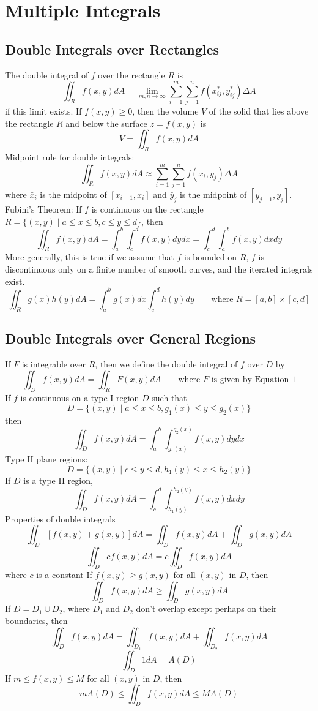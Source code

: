 \documentclass{article}
\title{} %
\author{John Yang}
\begin{document}
    \maketitle
    \tableofcontents
    \section{Multiple Integrals} %
    \subsection{Double Integrals over Rectangles} %
    \begin{outline}
        \1 The double integral of $f$ over the rectangle $R$ is \[\iint_Rf(x,y)dA=\lim_{m,n\to\infty}\sum^m_{i=1}\sum^n_{j=1}f(x_{ij}^*,y_{ij}^*)\Delta A\] if this limit exists. 
        \1 If \(f(x,y)\geq 0\), then the volume $V$ of the solid that lies above the rectangle $R$ and below the surface \(z=f(x,y)\) is \[V=\iint_Rf(x,y)dA\]
        \1 Midpoint rule for double integrals: \[\iint_Rf(x,y)dA\approx\sum^m_{i=1}\sum^n_{j=1}f(\bar x_i,\bar y_j)\Delta A\] where \(\bar x_i\) is the midpoint of \([x_{i-1},x_i]\) and \(\bar y_j\) is the midpoint of \([y_{j-1},y_j]\). 
        \1 Fubini's Theorem: If $f$ is continuous on the rectangle \(R=\{(x,y)\;|\;a\leq x\leq b,c\leq y\leq d\}\), then \[\iint_Rf(x,y)dA=\int^b_a\int^d_cf(x,y)dydx=\int^d_c\int^b_af(x,y)dxdy\] More generally, this is true if we assume that $f$ is bounded on $R$, $f$ is discontinuous only on a finite number of smooth curves, and the iterated integrals exist. 
        \1 \[\iint_Rg(x)h(y)dA=\int^b_ag(x)dx\int^d_ch(y)dy\qquad\text{where }R=[a,b]\times[c,d]\]

    \end{outline}
    \subsection{Double Integrals over General Regions}
    \begin{outline}
        \1 If $F$ is integrable over $R$, then we define the double integral of $f$ over $D$ by \[\iint_Df(x,y)dA=\iint_RF(x,y)dA\qquad\text{where }F\text{ is given by Equation 1}\]
        \1 If $f$ is continuous on a type I region $D$ such that \[D=\{(x,y)\;|\;a\leq x\leq b, g_1(x)\leq y\leq g_2(x)\}\] then \[\iint_Df(x,y)dA=\int^b_a\int^{g_2(x)}_{g_1(x)}f(x,y)dydx\]
        \1 Type II plane regions: \[D=\{(x,y)\;|\;c\leq y\leq d, h_1(y)\leq x\leq h_2(y)\}\]
        \1 If $D$ is a type II region, \[\iint_Df(x,y)dA=\int^d_c\int^{h_2(y)}_{h_1(y)}f(x,y)dxdy\]
        \1 Properties of double integrals 
            \2 \[\iint_D[f(x,y)+g(x,y)]dA=\iint_Df(x,y)dA+\iint_Dg(x,y)dA\]
            \2 \[\iint_Dcf(x,y)dA=c\iint_Df(x,y)dA\] where $c$ is a constant
            \2 If \(f(x,y)\geq g(x,y)\) for all \((x,y)\) in $D$, then \[\iint_Df(x,y)dA\geq\iint_Dg(x,y)dA\]
        \1 If \(D=D_1\cup D_2\), where $D_1$ and $D_2$ don't overlap except perhaps on their boundaries, then \[\iint_Df(x,y)dA=\iint_{D_1}f(x,y)dA+\iint_{D_2}f(x,y)dA\]
        \1 \[\iint_D1dA=A(D)\]
        \1 If \(m\leq f(x,y)\leq M\) for all \((x,y)\) in $D$, then \[mA(D)\leq\iint_Df(x,y)dA\leq MA(D)\]
    \end{outline}
\end{document}
